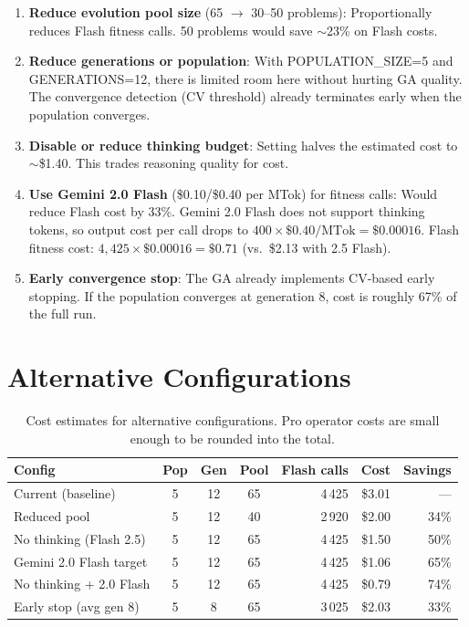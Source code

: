 \documentclass[11pt,a4paper]{report}
\begin{document}
\begin{enumerate}
  \item \textbf{Reduce evolution pool size} (65 $\rightarrow$ 30--50 problems): Proportionally
        reduces Flash fitness calls.  50 problems would save $\sim$23\% on Flash costs.

  \item \textbf{Reduce generations or population}: With POPULATION\_SIZE=5 and GENERATIONS=12,
        there is limited room here without hurting GA quality.  The convergence detection
        (CV threshold) already terminates early when the population converges.

  \item \textbf{Disable or reduce thinking budget}: Setting  halves
        the estimated cost to $\sim$\$1.40.  This trades reasoning quality for cost.

  \item \textbf{Use Gemini 2.0 Flash} (\$0.10/\$0.40 per MTok) for fitness calls:
        Would reduce Flash cost by 33\%.  Gemini 2.0 Flash does not support thinking tokens,
        so output cost per call drops to $400 \times \$0.40/\text{MTok} = \$0.00016$.
        Flash fitness cost: $4{,}425 \times \$0.00016 = \$0.71$ (vs.\ \$2.13 with 2.5 Flash).

  \item \textbf{Early convergence stop}: The GA already implements CV-based early stopping.
        If the population converges at generation 8, cost is roughly 67\% of the full run.
\end{enumerate}

\section{Alternative Configurations}

\begin{table}[h]
\centering
\renewcommand{\arraystretch}{1.15}
\begin{tabular}{@{}lcccrrr@{}}
\toprule
\textbf{Config} & \textbf{Pop} & \textbf{Gen} & \textbf{Pool} & {\textbf{Flash calls}} & {\textbf{Cost}} & {\textbf{Savings}} \\
\midrule
Current (baseline)    & 5 & 12 & 65 & 4\,425 & \$3.01 & {---} \\
\midrule
Reduced pool          & 5 & 12 & 40 & 2\,920 & \$2.00 & 34\% \\
No thinking (Flash 2.5) & 5 & 12 & 65 & 4\,425 & \$1.50 & 50\% \\
Gemini 2.0 Flash target & 5 & 12 & 65 & 4\,425 & \$1.06 & 65\% \\
No thinking + 2.0 Flash & 5 & 12 & 65 & 4\,425 & \$0.79 & 74\% \\
Early stop (avg gen 8)  & 5 & 8  & 65 & 3\,025 & \$2.03 & 33\% \\
\bottomrule
\end{tabular}
\caption{Cost estimates for alternative configurations.  Pro operator costs are
         small enough to be rounded into the total.}
\end{table}
\end{document}

